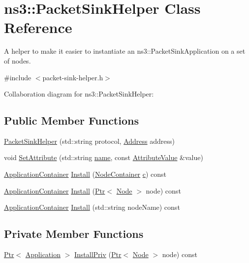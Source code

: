 \hypertarget{classns3_1_1PacketSinkHelper}{}\section{ns3\+:\+:Packet\+Sink\+Helper Class Reference}
\label{classns3_1_1PacketSinkHelper}


A helper to make it easier to instantiate an ns3\+::\+Packet\+Sink\+Application on a set of nodes.  




{\ttfamily \#include $<$packet-\/sink-\/helper.\+h$>$}



Collaboration diagram for ns3\+:\+:Packet\+Sink\+Helper\+:
\subsection*{Public Member Functions}
\begin{DoxyCompactItemize}
\item 
\hyperlink{classns3_1_1PacketSinkHelper_ab5bb6dd697dd00333357314302969935}{Packet\+Sink\+Helper} (std\+::string protocol, \hyperlink{classns3_1_1Address}{Address} address)
\item 
void \hyperlink{classns3_1_1PacketSinkHelper_a04bcaf17a17c89aa1d58062a8cb92cfa}{Set\+Attribute} (std\+::string \hyperlink{generate__test__data__lte__spectrum__model_8m_ab74e6bf80237ddc4109968cedc58c151}{name}, const \hyperlink{classns3_1_1AttributeValue}{Attribute\+Value} \&value)
\item 
\hyperlink{classns3_1_1ApplicationContainer}{Application\+Container} \hyperlink{classns3_1_1PacketSinkHelper_a394059adb24348dd366ce703fc39bbdd}{Install} (\hyperlink{classns3_1_1NodeContainer}{Node\+Container} \hyperlink{mmwave_2model_2fading-traces_2fading__trace__generator_8m_ae0323a9039add2978bf5b49550572c7c}{c}) const 
\item 
\hyperlink{classns3_1_1ApplicationContainer}{Application\+Container} \hyperlink{classns3_1_1PacketSinkHelper_a7f1fecb3dd6094ca03ec1de288d77e9f}{Install} (\hyperlink{classns3_1_1Ptr}{Ptr}$<$ \hyperlink{classns3_1_1Node}{Node} $>$ node) const 
\item 
\hyperlink{classns3_1_1ApplicationContainer}{Application\+Container} \hyperlink{classns3_1_1PacketSinkHelper_a804343a5e7b2f7d7a7afb5d9afe5e299}{Install} (std\+::string node\+Name) const 
\end{DoxyCompactItemize}
\subsection*{Private Member Functions}
\begin{DoxyCompactItemize}
\item 
\hyperlink{classns3_1_1Ptr}{Ptr}$<$ \hyperlink{classns3_1_1Application}{Application} $>$ \hyperlink{classns3_1_1PacketSinkHelper_abae857f9a8fcbd64ea5a470d0b980371}{Install\+Priv} (\hyperlink{classns3_1_1Ptr}{Ptr}$<$ \hyperlink{classns3_1_1Node}{Node} $>$ node) const 
\end{DoxyCompactItemize}
